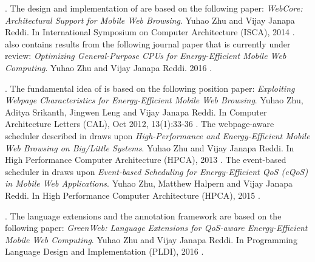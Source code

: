 \textbf{}. The design and implementation of \webcore are based on the following paper: \textit{WebCore: Architectural Support for Mobile Web Browsing}. Yuhao Zhu and Vijay Janapa Reddi. In International Symposium on Computer Architecture (ISCA), 2014 \cite{webcore}.  also contains results from the following journal paper that is currently under review: \textit{Optimizing General-Purpose CPUs for Energy-Efficient Mobile Web Computing}. Yuhao Zhu and Vijay Janapa Reddi. 2016 \cite{webcore-tocs}.

\textbf{}. The fundamental idea of \webrt is based on the following position paper:  \textit{Exploiting Webpage Characteristics for Energy-Efficient Mobile Web Browsing}. Yuhao Zhu, Aditya Srikanth, Jingwen Leng and Vijay Janapa Reddi. In Computer Architecture Letters (CAL), Oct 2012, 13(1):33-36 \cite{zhu2014exploiting}. The webpage-aware scheduler described in  draws upon \textit{High-Performance and Energy-Efficient Mobile Web Browsing on Big/Little Systems}. Yuhao Zhu and Vijay Janapa Reddi.  In High Performance Computer Architecture (HPCA), 2013 \cite{big-little}. The event-based scheduler in  draws upon \textit{Event-based Scheduling for Energy-Efficient QoS (eQoS) in Mobile Web Applications}. Yuhao Zhu, Matthew Halpern and Vijay Janapa Reddi. In High Performance Computer Architecture (HPCA), 2015 \cite{ebs}.

\textbf{}. The \greenweb language extensions and the \autogreen annotation framework are based on the following paper: \textit{GreenWeb: Language Extensions for QoS-aware Energy-Efficient Mobile Web Computing}. Yuhao Zhu and Vijay Janapa Reddi. In Programming Language Design and Implementation (PLDI), 2016 \cite{greenweb}.


